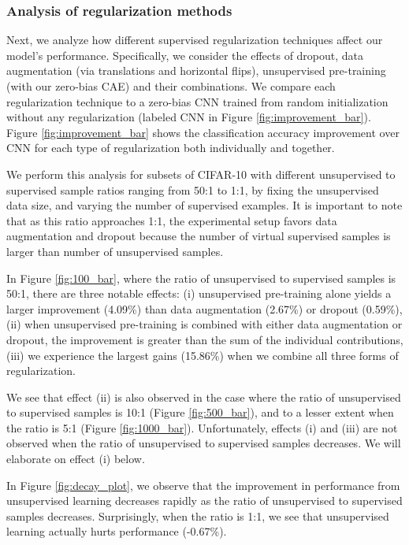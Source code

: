 \documentclass{article} \usepackage{iclr2015,times}
\begin{document}
\subsubsection{Analysis of regularization methods}
Next, we analyze how different supervised regularization techniques affect our model's performance. Specifically, we consider the effects of dropout, data augmentation (via translations and horizontal flips), unsupervised pre-training (with our zero-bias CAE) and their combinations. We compare each regularization technique to a zero-bias CNN trained from random initialization without any regularization (labeled CNN in Figure \ref{fig:improvement_bar}). Figure \ref{fig:improvement_bar} shows the classification accuracy improvement over CNN for each type of regularization both individually and together.

We perform this analysis for subsets of CIFAR-10 with different unsupervised to supervised sample ratios ranging from 50:1 to 1:1, by fixing the unsupervised data size, and varying the number of supervised examples. It is important to note that as this ratio approaches 1:1, the experimental setup favors data augmentation and dropout because the number of virtual supervised samples is larger than number of unsupervised samples.

In Figure \ref{fig:100_bar}, where the ratio of unsupervised to supervised samples is 50:1, there are three notable effects: (i) unsupervised pre-training alone yields a larger improvement (4.09\%) than data augmentation (2.67\%) or dropout (0.59\%), (ii) when unsupervised pre-training is combined with either data augmentation or dropout, the improvement is greater than the sum of the individual contributions, (iii) we experience the largest gains (15.86\%) when we combine all three forms of regularization.

We see that effect (ii) is also observed in the case where the ratio of unsupervised to supervised samples is 10:1 (Figure \ref{fig:500_bar}), and to a lesser extent when the ratio is 5:1 (Figure \ref{fig:1000_bar}). Unfortunately, effects (i) and (iii) are not observed when the ratio of unsupervised to supervised samples decreases. We will elaborate on effect (i) below.

In Figure \ref{fig:decay_plot}, we observe that the improvement in performance from unsupervised learning decreases rapidly as the ratio of unsupervised to supervised samples decreases. Surprisingly, when the ratio is 1:1, we see that unsupervised learning actually hurts performance (-0.67\%).
\end{document}
